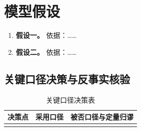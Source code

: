 %
\section{模型假设}

\begin{enumerate}
  \item \textbf{假设一。} 依据：……
  \item \textbf{假设二。} 依据：……
\end{enumerate}

\subsection{关键口径决策与反事实核验}
\begin{table}[htbp]
  \centering
  \caption{关键口径决策表}
  \begin{tabularx}{\linewidth}{llX}
    \toprule
    决策点 & 采用口径 & 被否口径与定量归谬 \\
    \midrule
     &  &  \\
    \bottomrule
  \end{tabularx}
\end{table}
